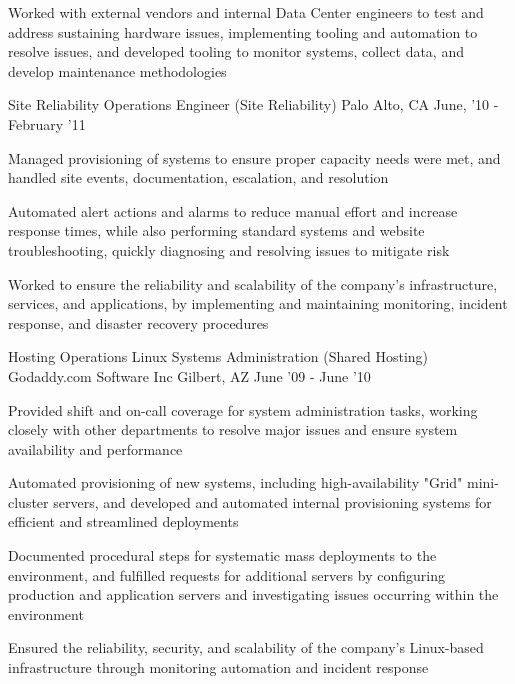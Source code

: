 \begin{cventries}
{\begin{cvitems}
		  \item Worked with external vendors and internal Data Center engineers to test and address sustaining hardware issues, implementing tooling and automation to resolve issues, and developed tooling to monitor systems, collect data, and develop maintenance methodologies
        \end{cvitems}
    }
\vspace{0mm}
\cventry
	{Site Reliability Operations Engineer \color{solarized-orange}(Site Reliability)} %
    {} %
    {Palo Alto, CA} %
    {June, '10 - February '11} %
    {
        \begin{cvitems}
		  \item Managed provisioning of systems to ensure proper capacity needs were met, and handled site events, documentation, escalation, and resolution
	      \item Automated alert actions and alarms to reduce manual effort and increase response times, while also performing standard systems and website troubleshooting, quickly diagnosing and resolving issues to mitigate risk
		  \item Worked to ensure the reliability and scalability of the company's infrastructure, services, and applications, by implementing and maintaining monitoring, incident response, and disaster recovery procedures
        \end{cvitems}
    }
\vspace{2mm}
\cventry
	{Hosting Operations Linux Systems Administration \color{solarized-orange}(Shared Hosting)} %
    {Godaddy.com Software Inc} %
    {Gilbert, AZ} %
    {June '09 - June '10} %
    {
        \begin{cvitems}
		  \item Provided shift and on-call coverage for system administration tasks, working closely with other departments to resolve major issues and ensure system availability and performance
		  \item Automated provisioning of new systems, including high-availability "Grid" mini-cluster servers, and developed and automated internal provisioning systems for efficient and streamlined deployments
		  \item Documented procedural steps for systematic mass deployments to the environment, and fulfilled requests for additional servers by configuring production and application servers and investigating issues occurring within the environment
		  \item Ensured the reliability, security, and scalability of the company's Linux-based infrastructure through monitoring automation and incident response

\end{cvitems}}
\end{cventries}
